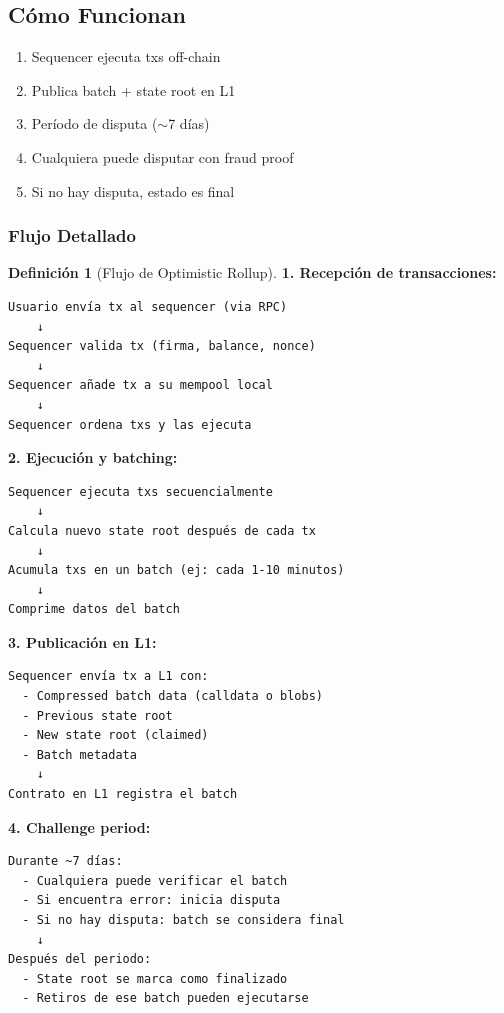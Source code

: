 \documentclass[11pt,a4paper,twoside,openright]{book}
\theoremstyle{definition}
\newtheorem{definition}{Definición}[chapter]
\theoremstyle{plain}
\theoremstyle{remark}
\begin{document}
\subsection{Cómo Funcionan}

\begin{enumerate}
    \item Sequencer ejecuta txs off-chain
    \item Publica batch + state root en L1
    \item Período de disputa ($\sim$7 días)
    \item Cualquiera puede disputar con fraud proof
    \item Si no hay disputa, estado es final
\end{enumerate}

\subsubsection{Flujo Detallado}

\begin{definition}[Flujo de Optimistic Rollup]
\textbf{1. Recepción de transacciones:}
\begin{verbatim}
Usuario envía tx al sequencer (via RPC)
    ↓
Sequencer valida tx (firma, balance, nonce)
    ↓
Sequencer añade tx a su mempool local
    ↓
Sequencer ordena txs y las ejecuta
\end{verbatim}

\textbf{2. Ejecución y batching:}
\begin{verbatim}
Sequencer ejecuta txs secuencialmente
    ↓
Calcula nuevo state root después de cada tx
    ↓
Acumula txs en un batch (ej: cada 1-10 minutos)
    ↓
Comprime datos del batch
\end{verbatim}

\textbf{3. Publicación en L1:}
\begin{verbatim}
Sequencer envía tx a L1 con:
  - Compressed batch data (calldata o blobs)
  - Previous state root
  - New state root (claimed)
  - Batch metadata
    ↓
Contrato en L1 registra el batch
\end{verbatim}

\textbf{4. Challenge period:}
\begin{verbatim}
Durante ~7 días:
  - Cualquiera puede verificar el batch
  - Si encuentra error: inicia disputa
  - Si no hay disputa: batch se considera final
    ↓
Después del periodo:
  - State root se marca como finalizado
  - Retiros de ese batch pueden ejecutarse
\end{verbatim}
\end{definition}
\end{document}
